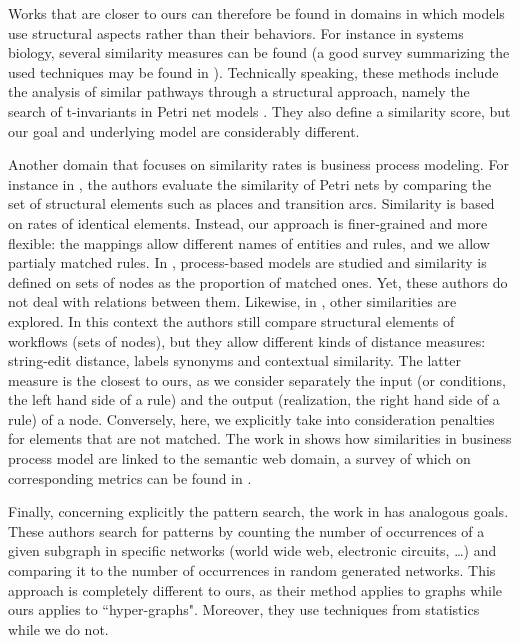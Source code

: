 \documentclass[a4paper,twoside]{article}
\begin{document}
Works that are closer to ours can therefore be found in domains in which models use structural aspects rather than their behaviors. %
For instance in systems biology, several similarity measures can be found (a good survey summarizing the used techniques may be found in \cite{bbw090}). %
Technically speaking, these methods include the analysis of similar pathways through a structural approach, namely the search of t-invariants in Petri net models \cite{Baldan2013ComparingMP, DBLP:journals/topnoc/BaldanCGS13, Grafahrend-Belau2008}.
They also define a similarity score, but our goal and underlying model are considerably different.

Another domain that focuses on similarity rates is business process modeling. For instance in \cite{xiao}, the authors evaluate the similarity of Petri nets by comparing the set of structural elements such as places and transition arcs. Similarity is based on rates of identical elements. 
Instead, our approach is finer-grained and more flexible: the mappings allow different names of entities and rules, and we allow partialy matched rules. %
In \cite{bae}, process-based models are studied and similarity is defined on sets of nodes as the proportion of matched ones.  %
Yet, these authors do not deal with relations between them. Likewise, in \cite{DIJKMAN2011498},  other similarities are explored. In this context the authors still compare structural elements of workflows (\eg sets of nodes), but they allow different kinds of distance measures: string-edit distance, labels synonyms and contextual similarity. 
The latter measure is the closest to ours, as we consider separately the input (or conditions, the left hand side of a rule) and the output (realization, the right hand side of a rule) of a node.  %
Conversely, here, we explicitly take into consideration penalties for elements that are not matched. 
The work in \cite{DIJKMAN2011498} shows how similarities in business process model are linked to the semantic web domain, a survey of which on corresponding metrics can be found in \cite{Euzenat}.  %


Finally, concerning explicitly the pattern search, the work in \cite{Milo824} has analogous goals. These authors search for patterns by counting the number of occurrences of a given subgraph in 
specific networks (world wide web, electronic circuits, \dots) and comparing it to the number of occurrences in random generated networks. %
This approach is completely  different to ours, as their method applies to graphs while ours applies to  ``hyper-graphs". Moreover, they use techniques from statistics while we do not.
\end{document}
